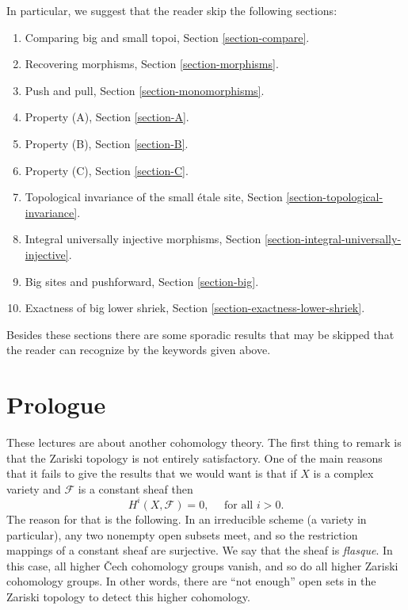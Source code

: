 \medskip\noindent
In particular, we suggest that the reader skip the following sections:
\begin{enumerate}
\item Comparing big and small topoi,
Section \ref{section-compare}.
\item Recovering morphisms,
Section \ref{section-morphisms}.
\item Push and pull,
Section \ref{section-monomorphisms}.
\item Property (A),
Section \ref{section-A}.
\item Property (B),
Section \ref{section-B}.
\item Property (C),
Section \ref{section-C}.
\item Topological invariance of the small \'etale site,
Section \ref{section-topological-invariance}.
\item Integral universally injective morphisms,
Section \ref{section-integral-universally-injective}.
\item Big sites and pushforward,
Section \ref{section-big}.
\item Exactness of big lower shriek,
Section \ref{section-exactness-lower-shriek}.
\end{enumerate}
Besides these sections there are some sporadic results that may be skipped
that the reader can recognize by the keywords given above.



\section{Prologue}
\label{section-prologue}

\noindent
These lectures are about another cohomology theory. The first thing to remark
is that the Zariski topology is not entirely satisfactory. One of the main
reasons that it fails to give the results that we would want is that if $X$ is
a complex variety and $\mathcal{F}$ is a constant sheaf then
$$
H^i(X, \mathcal{F}) = 0, \quad \text{ for all } i > 0.
$$
The reason for that is the following. In an irreducible scheme (a variety in
particular), any two nonempty open subsets meet, and so the restriction
mappings of a constant sheaf are surjective. We say that the sheaf is
{\it flasque}. In this case, all higher {\v C}ech cohomology groups vanish, and
so do all higher Zariski cohomology groups. In other words, there are ``not
enough'' open sets in the Zariski topology to detect this higher cohomology.

